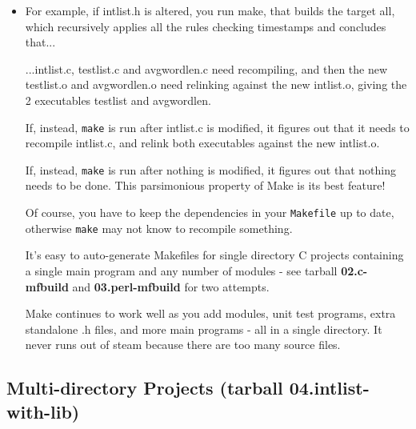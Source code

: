 \documentclass[handout]{beamer}
\begin{document}
\begin{frame}[fragile]

\begin{itemize}
      \item
       For example, if \alert{intlist.h} is altered, you run \alert{make},
       that builds the target \alert{all}, which recursively applies all
       the rules checking timestamps and concludes that...

       \pitem
       ...\alert{intlist.c},
       \alert{testlist.c} and \alert{avgwordlen.c} need recompiling,
       and then the new \alert{testlist.o} and \alert{avgwordlen.o}
       need relinking against the new \alert{intlist.o}, giving the
       2 executables \alert{testlist} and \alert{avgwordlen}.

      \pitem
      If, instead, \verb+make+ is run after \alert{intlist.c} is modified,
      it figures out that it needs to recompile \alert{intlist.c},
      and relink both executables against the
      new \alert{intlist.o}.

      \pitem
      If, instead, \verb+make+ is run after nothing is modified,
      it figures out that nothing needs to be done.
      This \alert{parsimonious} property of Make is its best feature!

      \pitem
      Of course, you have to keep the dependencies in your \verb+Makefile+
      up to date, otherwise \verb+make+ may not know to recompile something.

      \pitem
      It's easy to auto-generate Makefiles for
      single directory C projects containing a single main program and
      any number of modules -
      see tarball {\bf 02.c-mfbuild} and {\bf 03.perl-mfbuild} for two
      attempts.

      \pitem 
      Make continues to work well as you add modules, unit test programs, extra standalone .h files,
      and more main programs - all in a single directory.  It never \alert{runs out of steam} because there are too many source files.


\end{itemize}

\end{frame}

\subsection{Multi-directory Projects (tarball 04.intlist-with-lib)}
\end{document}
